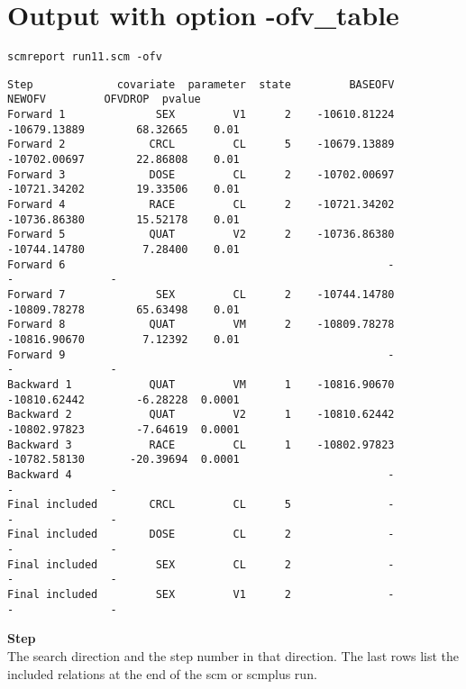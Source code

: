 \documentclass[hideglossary,notoc,hidelof,hidelot,hideTheSignaturePage,hideLinkCurrent,hideloa,pdfLatex,noClient,notitle,hideConfidential]{PMXstyle-20190820}
\begin{document}
\section{Output with option -ofv\_table}
\begin{verbatim}
scmreport run11.scm -ofv
\end{verbatim}
{\tiny
\begin{verbatim}
Step             covariate  parameter  state         BASEOFV          NEWOFV         OFVDROP  pvalue
Forward 1              SEX         V1      2    -10610.81224    -10679.13889        68.32665    0.01
Forward 2             CRCL         CL      5    -10679.13889    -10702.00697        22.86808    0.01
Forward 3             DOSE         CL      2    -10702.00697    -10721.34202        19.33506    0.01
Forward 4             RACE         CL      2    -10721.34202    -10736.86380        15.52178    0.01
Forward 5             QUAT         V2      2    -10736.86380    -10744.14780         7.28400    0.01
Forward 6                                                  -               -               -        
Forward 7              SEX         CL      2    -10744.14780    -10809.78278        65.63498    0.01
Forward 8             QUAT         VM      2    -10809.78278    -10816.90670         7.12392    0.01
Forward 9                                                  -               -               -        
Backward 1            QUAT         VM      1    -10816.90670    -10810.62442        -6.28228  0.0001
Backward 2            QUAT         V2      1    -10810.62442    -10802.97823        -7.64619  0.0001
Backward 3            RACE         CL      1    -10802.97823    -10782.58130       -20.39694  0.0001
Backward 4                                                 -               -               -        
Final included        CRCL         CL      5               -               -               -        
Final included        DOSE         CL      2               -               -               -        
Final included         SEX         CL      2               -               -               -        
Final included         SEX         V1      2               -               -               -        
\end{verbatim}
}



{\bfseries Step}\\
The search direction and the step number in that direction. The last rows list the included relations
at the end of the scm or scmplus run.
\end{document}
